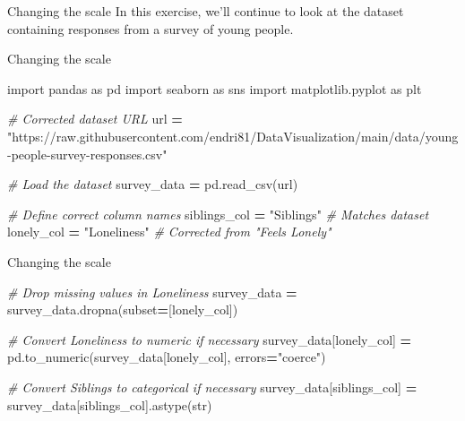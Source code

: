 \documentclass[
  ignorenonframetext,
]{beamer}
\newenvironment{Shaded}{\begin{snugshade}}{\end{snugshade}}
\newcommand{\BuiltInTok}[1]{#1}
\newcommand{\CommentTok}[1]{\textcolor[rgb]{0.56,0.35,0.01}{\textit{#1}}}
\newcommand{\ImportTok}[1]{#1}
\newcommand{\NormalTok}[1]{#1}
\newcommand{\OperatorTok}[1]{\textcolor[rgb]{0.81,0.36,0.00}{\textbf{#1}}}
\newcommand{\StringTok}[1]{\textcolor[rgb]{0.31,0.60,0.02}{#1}}
\begin{document}
\begin{frame}{Changing the scale}
\label{changing-the-scale}
In this exercise, we'll continue to look at the dataset containing
responses from a survey of young people.
\end{frame}

\begin{frame}[fragile]{Changing the scale}
\label{changing-the-scale-1}

\begin{Shaded}
\begin{Highlighting}[]
\ImportTok{import}\NormalTok{ pandas }\ImportTok{as}\NormalTok{ pd}
\ImportTok{import}\NormalTok{ seaborn }\ImportTok{as}\NormalTok{ sns}
\ImportTok{import}\NormalTok{ matplotlib.pyplot }\ImportTok{as}\NormalTok{ plt}

\CommentTok{\# Corrected dataset URL}
\NormalTok{url }\OperatorTok{=} \StringTok{"https://raw.githubusercontent.com/endri81/DataVisualization/main/data/young{-}people{-}survey{-}responses.csv"}

\CommentTok{\# Load the dataset}
\NormalTok{survey\_data }\OperatorTok{=}\NormalTok{ pd.read\_csv(url)}


\CommentTok{\# Define correct column names}
\NormalTok{siblings\_col }\OperatorTok{=} \StringTok{"Siblings"}  \CommentTok{\# Matches dataset}
\NormalTok{lonely\_col }\OperatorTok{=} \StringTok{"Loneliness"}  \CommentTok{\# Corrected from "Feels Lonely"}
\end{Highlighting}
\end{Shaded}
\end{frame}

\begin{frame}[fragile]{Changing the scale}
\label{changing-the-scale-2}

\begin{Shaded}
\begin{Highlighting}[]
\CommentTok{\# Drop missing values in Loneliness}
\NormalTok{survey\_data }\OperatorTok{=}\NormalTok{ survey\_data.dropna(subset}\OperatorTok{=}\NormalTok{[lonely\_col])}

\CommentTok{\# Convert Loneliness to numeric if necessary}
\NormalTok{survey\_data[lonely\_col] }\OperatorTok{=}\NormalTok{ pd.to\_numeric(survey\_data[lonely\_col], errors}\OperatorTok{=}\StringTok{"coerce"}\NormalTok{)}

\CommentTok{\# Convert Siblings to categorical if necessary}
\NormalTok{survey\_data[siblings\_col] }\OperatorTok{=}\NormalTok{ survey\_data[siblings\_col].astype(}\BuiltInTok{str}\NormalTok{)}
\end{Highlighting}
\end{Shaded}
\end{frame}
\end{document}
